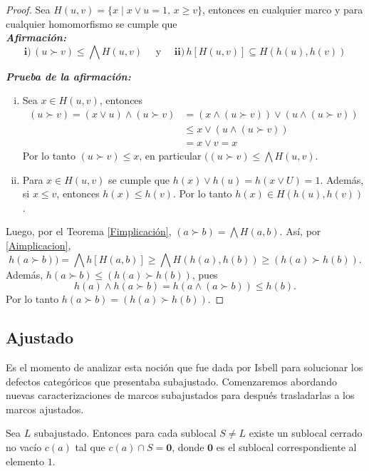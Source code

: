\documentclass{comunicaciones}
\begin{document}
\begin{proof}
    Sea $H(u, v)=\{x\mid x\vee u=1,\, x\geq v\}$, entonces en cualquier marco y para cualquier homomorfismo se cumple que\\

    \noindent
    \emph{\textbf{Afirmación:}}
    \begin{equation}\label{Aimplicacion}
    \mathbf{ i) }\,(u\succ v)\leq \bigwedge H(u, v)\quad \mbox{ y }\quad \mathbf{ ii) }\,h[H(u, v)]\subseteq H(h(u), h(v))
    \end{equation}

    \noindent
    \emph{\textbf{Prueba de la afirmación:}} 
    \begin{enumerate}[i)]
        \item Sea $x\in H(u, v)$, entonces 
    \[
    \begin{split}
    (u\succ v)=(x\vee u)\wedge (u\succ v) & =(x\wedge (u\succ v))\vee (u\wedge (u\succ v))\\
    & \leq x\vee (u\wedge (u\succ v))\\
    & =x\vee v=x
    \end{split}
    \]
    Por lo tanto $(u\succ v)\leq x$, en particular $((u\succ v)\leq \bigwedge H(u, v)$.
    \item Para $x\in H(u, v)$ se cumple que $h(x)\vee h(u)=h(x\vee U)=1$. Además, si $x\leq v$, entonces $h(x)\leq h(v)$. Por lo tanto $h(x)\in H(h(u), h(v))$.
    \end{enumerate}
    Luego, por el Teorema \ref{Fimplicación}, $(a\succ b)=\bigwedge H(a, b)$. Así, por \ref{Aimplicacion},
    \[
    h(a\succ b))=\bigwedge h[H(a, b)]\geq \bigwedge H(h(a), h(b))\geq (h(a)\succ h(b)).
    \]
    Además, $h(a\succ b)\leq (h(a)\succ h(b))$, pues 
    \[
    h(a)\wedge h(a\succ b)=h(a\wedge (a\succ b))\leq h(b).
    \]
    Por lo tanto $h(a\succ b)=(h(a)\succ h(b))$.
\end{proof}

\subsection{Ajustado}

Es el momento de analizar esta noción que fue dada por Isbell para solucionar los defectos categóricos que presentaba subajustado. Comenzaremos abordando nuevas caracterizaciones de marcos subajustados para después trasladarlas a los marcos ajustados.

\begin{prop}\label{Cerradosaju}
    Sea $L$ subajustado. Entonces para cada sublocal $S\neq L$ existe un sublocal cerrado no vacío $c(a)$ tal que $c(a)\cap S=\mathbf{0}$, donde $\mathbf{0}$ es el sublocal correspondiente al elemento $1$.
\end{prop}
\end{document}
